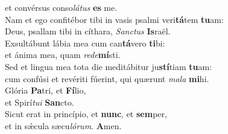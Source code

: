 \oddverse et convérsus conso\textit{lá}\textit{tus} \textbf{es} me.\\
\evenverse Nam et ego confitébor tibi in vasis psalmi veri\textbf{tá}tem \textbf{tu}am:~\*\\
\evenverse Deus, psallam tibi in cíthara, \textit{San}\textit{ctus} \textbf{Is}raël.\\
\oddverse Exsultábunt lábia mea cum can\textbf{tá}vero \textbf{ti}bi:~\*\\
\oddverse et ánima mea, quam \textit{re}\textit{de}\textbf{mí}sti.\\
\evenverse Sed et lingua mea tota die meditábitur ju\textbf{stí}tiam \textbf{tu}am:~\*\\
\evenverse cum confúsi et revériti fúerint, qui quærunt \textit{ma}\textit{la} \textbf{mi}hi.\\
\oddverse Glória \textbf{Pa}tri, et \textbf{Fí}lio,~\*\\
\oddverse et Spirí\textit{tu}\textit{i} \textbf{San}cto.\\
\evenverse Sicut erat in princípio, et \textbf{nunc}, et \textbf{sem}per,~\*\\
\evenverse et in sǽcula sæcu\textit{ló}\textit{rum}. \textbf{A}men.\\
